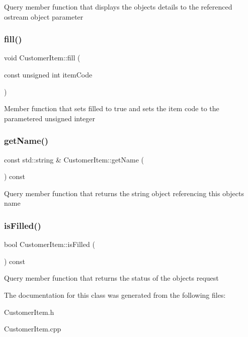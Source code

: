 Query member function that displays the object\textquotesingle{}s details to the referenced ostream object parameter \mbox{\label{classCustomerItem_a31c01c091f1ebc623a66d80235bc5e8c}} 
\subsubsection{\texorpdfstring{fill()}{fill()}}
{\footnotesize\ttfamily void Customer\+Item\+::fill (\begin{DoxyParamCaption}\item[{const unsigned int}]{item\+Code }\end{DoxyParamCaption})}

Member function that sets filled to true and sets the item code to the parametered unsigned integer \mbox{\label{classCustomerItem_a7922e8405fdcfff7ca45decd2a54efdc}} 
\subsubsection{\texorpdfstring{get\+Name()}{getName()}}
{\footnotesize\ttfamily const std\+::string \& Customer\+Item\+::get\+Name (\begin{DoxyParamCaption}{ }\end{DoxyParamCaption}) const}

Query member function that returns the string object referencing this object\textquotesingle{}s name \mbox{\label{classCustomerItem_a39f6b78f595b7d4a20f1e7f945834335}} 
\subsubsection{\texorpdfstring{is\+Filled()}{isFilled()}}
{\footnotesize\ttfamily bool Customer\+Item\+::is\+Filled (\begin{DoxyParamCaption}{ }\end{DoxyParamCaption}) const}

Query member function that returns the status of the object\textquotesingle{}s request 

The documentation for this class was generated from the following files\+:\begin{DoxyCompactItemize}
\item 
Customer\+Item.\+h\item 
Customer\+Item.\+cpp\end{DoxyCompactItemize}
